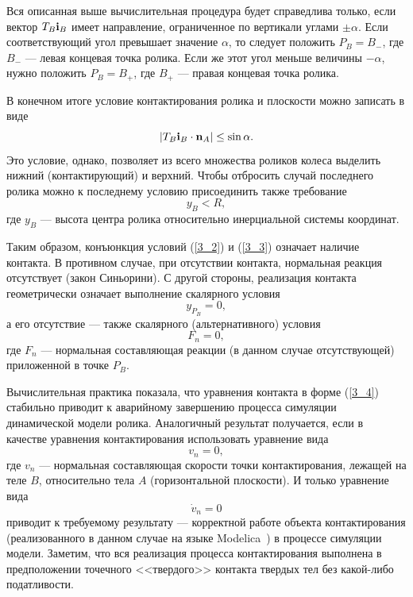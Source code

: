 \documentclass[12pt,a4paper]{article}
\begin{document}
Вся описанная выше вычислительная процедура будет справедлива только, если 
вектор $T_B{\bf i}_B$ имеет направление, ограниченное по вертикали углами
$\pm\alpha $. Если соответствующий угол превышает значение $\alpha $, то 
следует положить $P_B=B_{-}$, где $B_{-}$ --- левая концевая точка ролика. Если
же этот угол меньше величины $-\alpha $, нужно положить $P_B=B_{+}$, где 
$B_{+}$ --- правая концевая точка ролика.

В конечном итоге условие контактирования ролика и плоскости можно записать в 
виде
\begin{equation}
\left| T_B{\bf i}_B\cdot {\bf n}_A\right|\le\sin\alpha .
\label{3_2}
\end{equation}
Это условие, однако, позволяет из всего множества роликов колеса выделить 
нижний (контактирующий) и верхний. Чтобы отбросить случай последнего ролика
можно к последнему условию присоединить также требование 
\begin{equation}
y_B<R,
\label{3_3}
\end{equation}
где $y_B$ --- высота центра ролика относительно инерциальной системы координат.

Таким образом, конъюнкция условий (\ref{3_2}) и (\ref{3_3}) означает наличие
контакта. В противном случае, при отсутствии контакта, нормальная реакция 
отсутствует (закон Синьорини). С другой стороны, реализация контакта 
геометрически означает выполнение скалярного условия 
\begin{equation}
y_{P_B}=0,
\label{3_4}
\end{equation}
а его отсутствие --- также скалярного (альтернативного) условия
$$
F_n=0,
$$
где $F_n$ --- нормальная составляющая реакции (в данном случае отсутствующей) 
приложенной в точке $P_B$.

Вычислительная практика показала, что уравнения контакта в форме (\ref{3_4})
стабильно приводит к аварийному завершению процесса симуляции динамической 
модели ролика. Аналогичный результат получается, если в качестве уравнения 
контактирования использовать уравнение вида 
$$
v_n=0,
$$
где $v_n$ --- нормальная составляющая скорости точки контактирования, лежащей
на теле $B$, относительно тела $A$ (горизонтальной плоскости). И только 
уравнение вида
$$
\dot{v}_n=0
$$
приводит к требуемому результату --- корректной работе объекта контактирования
(реализованного в данном случае на языке Modelica~\cite{Fritzson}) в процессе 
симуляции модели. Заметим, что вся реализация процесса контактирования 
выполнена в предположении точечного <<твердого>> контакта твердых тел без 
какой-либо податливости.
\end{document}
